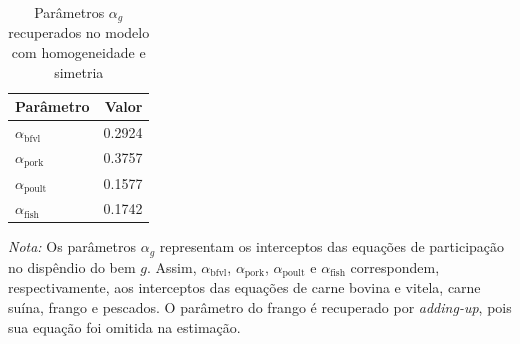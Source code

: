 
\begin{table}[H]
\centering
\caption{Parâmetros $\alpha_g$ recuperados no modelo com homogeneidade e simetria}
\label{tab:alpha-hsym}
\small
\begin{tabular}{@{}lr@{}}
\toprule
Parâmetro & Valor \\
\midrule
$\alpha_{\text{bfvl}}$  & 0.2924 \\
$\alpha_{\text{pork}}$  & 0.3757 \\
$\alpha_{\text{poult}}$ & 0.1577 \\
$\alpha_{\text{fish}}$  & 0.1742 \\
\bottomrule
\end{tabular}
\par\vspace{0.35em}
\begin{minipage}{0.92\textwidth}
\footnotesize
\textit{Nota:} Os parâmetros $\alpha_g$ representam os interceptos das equações de participação no dispêndio do bem $g$. Assim, $\alpha_{\text{bfvl}}$, $\alpha_{\text{pork}}$, $\alpha_{\text{poult}}$ e $\alpha_{\text{fish}}$ correspondem, respectivamente, aos interceptos das equações de carne bovina e vitela, carne suína, frango e pescados. O parâmetro do frango é recuperado por \textit{adding-up}, pois sua equação foi omitida na estimação.
\end{minipage}
\end{table}

